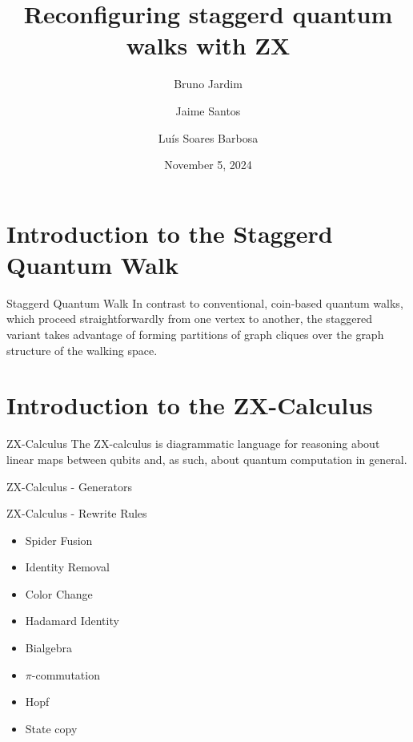 \documentclass{beamer}
\title{Reconfiguring staggerd quantum walks with ZX}
\date{November 5, 2024}
\author{Bruno Jardim \and Jaime Santos \and Luís Soares Barbosa}
\institute{HASLab - INESCTEC}
\begin{document}
\maketitle
\section{Introduction to the Staggerd Quantum Walk}
\begin{frame}{Staggerd Quantum Walk}
	In contrast to conventional, coin-based quantum walks, which proceed straightforwardly from one vertex to another, the staggered variant takes advantage of forming partitions of graph cliques over the graph structure of the walking space.
\end{frame}


\section{Introduction to the ZX-Calculus}
\begin{frame}{ZX-Calculus}
	The ZX-calculus is diagrammatic language for reasoning about linear maps between qubits and, as such, about quantum computation in general.


\end{frame}

\begin{frame}{ZX-Calculus - Generators}
\end{frame}
\begin{frame}{ZX-Calculus - Rewrite Rules}



	\begin{multicols}{2}
		\begin{itemize}
			\item Spider Fusion
			\item Identity Removal
			\item Color Change
			\item Hadamard Identity
			\item Bialgebra
			\item $\pi$-commutation
			\item Hopf
			\item State copy


		\end{itemize}
	\end{multicols}



\end{frame}
\end{document}

